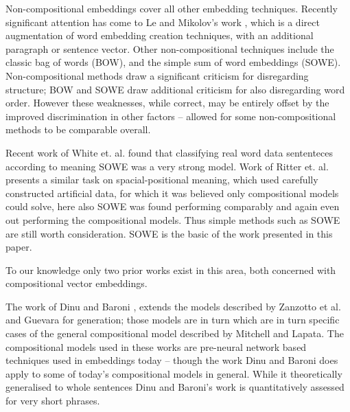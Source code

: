 \documentclass[]{scrartcl}
\begin{document}
Non-compositional embeddings cover all other embedding techniques. Recently significant attention has come to Le and Mikolov's work \cite{le2014distributed}, which is a direct augmentation of word embedding creation techniques, with an additional paragraph or sentence vector. Other non-compositional techniques include the classic bag of words (BOW), and the simple sum of word embeddings (SOWE). Non-compositional methods draw a significant criticism for disregarding structure; BOW and SOWE draw additional criticism for also disregarding word order. However these weaknesses, while correct, may be entirely offset by the improved discrimination in other factors -- allowed for some non-compositional methods to be comparable overall. 


Recent work of White et. al. \cite{White2015SentVecMeaning} found that classifying real word data sententeces according to meaning SOWE was a very strong model. Work of Ritter et. al. presents a similar task on spacial-positional meaning, which used carefully constructed artificial data, for which it was believed only compositional models could solve, here also SOWE was found performing comparably and again even out performing the compositional models. Thus simple methods such as SOWE are still worth consideration. SOWE is the basic of the work presented in this paper.


To our knowledge only two prior works exist in this area, both concerned with compositional vector embeddings.

The work of Dinu and Baroni \cite{Dinu2014CompositionalGeneration},  extends the models described by Zanzotto et al.\cite{zanzotto2010estimating} and Guevara\cite{Guevara2010} for generation; those models are in turn which are in turn specific cases of the general compositional model described by Mitchell and Lapata\cite{Mitchell2008}. The compositional models used in these works are pre-neural network based techniques used in embeddings today -- though the work Dinu and Baroni does apply to some of today's compositional models in general. While it theoretically generalised to whole sentences Dinu and Baroni's work is quantitatively assessed for very short phrases.

\end{document}
